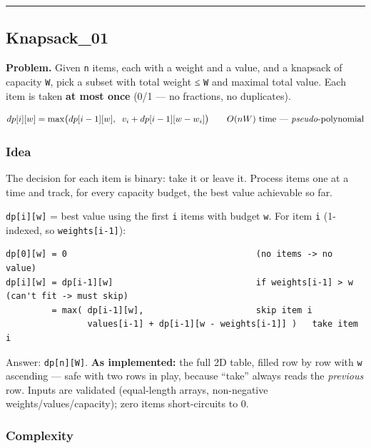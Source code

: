 \documentclass[
  10pt,
  letterpaper,
  onecolumn]{article}
\begin{document}
\begin{center}\rule{0.5\linewidth}{0.5pt}\end{center}

\hypertarget{knapsack_01}{%
\subsection{Knapsack\_01}\label{knapsack_01}}

\textbf{Problem.} Given \texttt{n} items, each with a weight and a
value, and a knapsack of capacity \texttt{W}, pick a subset with total
weight ≤ \texttt{W} and maximal total value. Each item is taken
\textbf{at most once} (0/1 --- no fractions, no duplicates).

\begin{equation*}
dp[i][w]=\max\bigl(dp[i-1][w],\;\;v_i+dp[i-1][w-w_i]\bigr)
\qquad O(nW)\text{ time — \emph{pseudo}-polynomial}
\end{equation*}

\hypertarget{idea-14}{%
\subsubsection{Idea}\label{idea-14}}

The decision for each item is binary: take it or leave it. Process items
one at a time and track, for every capacity budget, the best value
achievable so far.

\texttt{dp{[}i{]}{[}w{]}} = best value using the first \texttt{i} items
with budget \texttt{w}. For item \texttt{i} (1-indexed, so
\texttt{weights{[}i-1{]}}):

\begin{verbatim}
dp[0][w] = 0                                     (no items -> no value)
dp[i][w] = dp[i-1][w]                            if weights[i-1] > w   (can't fit -> must skip)
         = max( dp[i-1][w],                      skip item i
                values[i-1] + dp[i-1][w - weights[i-1]] )   take item i
\end{verbatim}

Answer: \texttt{dp{[}n{]}{[}W{]}}. \textbf{As implemented:} the full 2D
table, filled row by row with \texttt{w} ascending --- safe with two
rows in play, because ``take'' always reads the \emph{previous} row.
Inputs are validated (equal-length arrays, non-negative
weights/values/capacity); zero items short-circuits to 0.

\hypertarget{complexity-14}{%
\subsubsection{Complexity}\label{complexity-14}}
\end{document}
